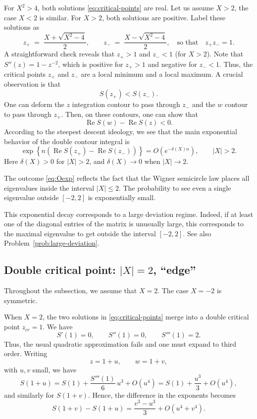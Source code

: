 \documentclass[letterpaper,11pt,oneside,reqno]{article}
\numberwithin{equation}{section}
\theoremstyle{definition}
\begin{document}
For \(X^2>4\), both solutions
\eqref{eq:critical-points}
are real. Let us assume $X>2$, the case \(X<2\) is similar.
For $X>2$, both solutions are positive.
Label these solutions as
\[
	z_+ \;=\;\frac{X + \sqrt{X^2-4}}{2},
	\qquad
	z_- \;=\;\frac{X - \sqrt{X^2-4}}{2},
	\quad
	\text{so that}\quad z_+z_-=1.
\]
A straightforward check reveals that \(z_+\!>\!1\) and \(z_-\!<\!1\) (for \(X>2\)).
Note that $S''(z)=1-z^{-2}$, which is positive for \(z_+>1\) and negative for \(z_-<1\).  Thus, the critical points \(z_+\) and \(z_-\) are a local minimum and a local maximum.
A crucial observation is that
\begin{equation*}
	S(z_+)<S(z_-).
\end{equation*}
One can deform the $z$ integration contour to pass through
$z_-$ and the $w$ contour to pass through $z_+$.
Then, on these contours, one can show that
\begin{equation*}
	\operatorname{Re}S(w)-\operatorname{Re}S(z)<0.
\end{equation*}
According to the steepest descent ideology,
we see that the main exponential behavior of the double contour integral is
\begin{equation}
	\label{eq:Oexp}
	\exp\left\{ n\left(
		\operatorname{Re}S(z_+)-\operatorname{Re}S(z_-)
\right) \right\}=O( e^{-\delta(X)n} ), \qquad |X|>2.
\end{equation}
Here $\delta(X)>0$ for $|X|>2$, and $\delta(X)\to0$ when $|X|\to2$.

The outcome \eqref{eq:Oexp} reflects the fact that the
Wigner semicircle law places all eigenvalues inside the
interval \(\lvert X\rvert \le 2\).
The probability to see even a single eigenvalue outside $[-2,2]$
is exponentially small.

This exponential decay corresponds to a large deviation regime.
Indeed, if at least one of the diagonal entries of the matrix
is unusually large, this corresponds to
the maximal eigenvalue to get outside the interval \([-2,2]\).
See also Problem~\ref{prob:large-deviation}.


\subsection{Double critical point: $|X|=2$, ``edge''}
\label{sub:double-critical-points}

Throughout the subsection, we assume that $X=2$. The case $X=-2$ is symmetric.

When \(X=2\), the two solutions in \eqref{eq:critical-points} merge into a double critical point
$z_{cr}=1$.
We have
\[
S'(1)=0,\qquad S''(1)=0,\qquad S'''(1)=2.
\]
Thus, the usual quadratic approximation fails and one must expand to third order. Writing
\[
z=1+u,\qquad w=1+v,
\]
with \(u,v\) small, we have
\[
S(1+u)=S(1)+\frac{S'''(1)}{6}\,u^3+O(u^4)
=S(1)+\frac{u^3}{3}+O(u^4),
\]
and similarly for \(S(1+v)\). Hence, the difference in the exponents becomes
\[
S(1+v)-S(1+u)=\frac{v^3-u^3}{3}+O(u^4+v^4).
\]
\end{document}
